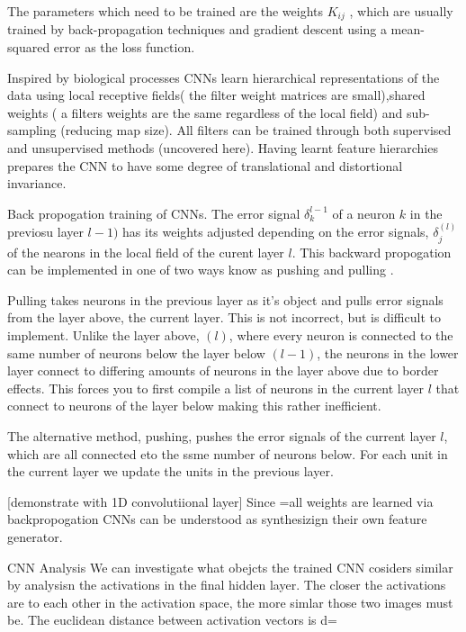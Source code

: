 The parameters which need to be trained are the weights $K_{ij}$ , which are usually trained by back-propagation techniques and gradient descent using a mean-squared error as the loss function.

Inspired by biological processes CNNs learn hierarchical representations of the data using local receptive fields( the filter weight matrices are small),shared weights ( a filters weights are the same regardless of the local field) and sub-sampling (reducing map size).
All filters can be trained through both supervised and unsupervised methods (uncovered here).
Having learnt feature hierarchies prepares the CNN to have some degree of translational and distortional invariance.




Back propogation training of CNNs.
The error signal $\delta_k^{l-1}$ of a neuron $k$ in the previosu layer $l-1)$ has its weights adjusted depending on the error signals, $\delta_j^{(l)}$ of the nearons in the local field of the curent layer $l$.
This backward propogation can be implemented in one of two ways know as pushing and pulling\citep{chen2014big} .

Pulling takes neurons in the previous layer as it's object and pulls error signals from the layer above, the current layer.
This is not incorrect, but is difficult to implement.
Unlike the layer above, $(l)$, where every neuron is connected to the same number of neurons below the layer below $(l-1)$, the neurons in the lower layer connect to differing amounts of neurons in the layer above due to border effects.
This forces you to first compile a list of neurons in the current layer $l$ that connect to neurons of the layer below making this rather inefficient.

The alternative method, pushing, pushes the error signals of the current layer $l$, which are all connected eto the ssme number of neurons below.
For each unit in the current layer we update the units in the previous layer.

[demonstrate with 1D convolutiional layer]
Since =all weights are learned via backpropogation CNNs can be understood as synthesizign their own feature generator\citep{lecun1995convolutional}.



CNN Analysis
We can investigate what obejcts the trained CNN cosiders similar by analysisn the activations in the final hidden layer\citep{krizhevsky2012imagenet}.
The closer the activations are to each other in the activation space, the more simlar those two images must be.
The euclidean distance between activation vectors is
\be 
d=
\ee

